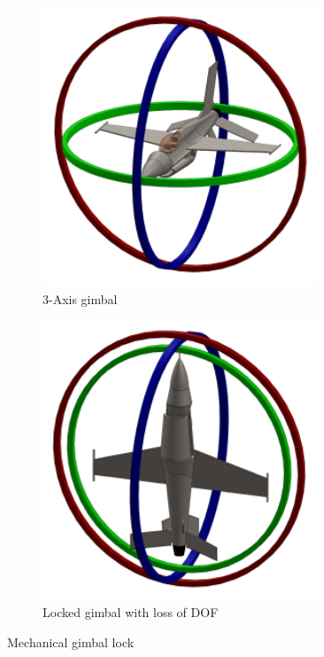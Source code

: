 \begin{figure}[htbp]
\begin{subfigure}{0.5\textwidth}
\centering
\includegraphics[width=0.9\textwidth]{figs/gimbal}
\caption{3-Axis gimbal}
\label{fig:gimbal}
\end{subfigure}
\begin{subfigure}{0.5\textwidth}
\centering
\includegraphics[width=0.9\textwidth]{figs/gimbal-lock}
\caption{Locked gimbal with loss of DOF}
\label{fig:gimbal-lock}
\end{subfigure}
\caption{Mechanical gimbal lock}
\vspace{-10pt}
\end{figure} 
